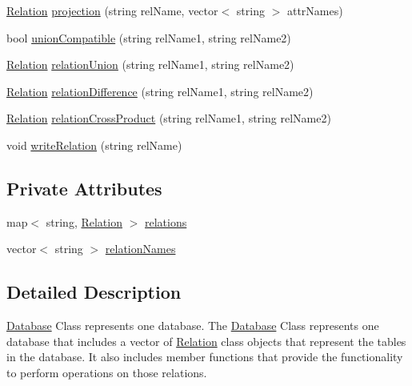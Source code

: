 \begin{DoxyCompactItemize}
\hyperlink{class_relation}{Relation} \hyperlink{class_database_af113b1e566197ff5231c7b792a6a4d98}{projection} (string rel\-Name, vector$<$ string $>$ attr\-Names)
\item 
bool \hyperlink{class_database_a9e61f5f7d4ac2b56ff768c908acec026}{union\-Compatible} (string rel\-Name1, string rel\-Name2)
\item 
\hyperlink{class_relation}{Relation} \hyperlink{class_database_a1fa5ff90a41f1231c58b841a9d3e0475}{relation\-Union} (string rel\-Name1, string rel\-Name2)
\item 
\hyperlink{class_relation}{Relation} \hyperlink{class_database_a8799dbd5a15a2e43c74bc4543fe8fa2e}{relation\-Difference} (string rel\-Name1, string rel\-Name2)
\item 
\hyperlink{class_relation}{Relation} \hyperlink{class_database_adabfc3cb1f51932ff08007200b0972a8}{relation\-Cross\-Product} (string rel\-Name1, string rel\-Name2)
\item 
void \hyperlink{class_database_a35f0c7002a68e6de2d8aa11fc42e8d38}{write\-Relation} (string rel\-Name)
\end{DoxyCompactItemize}
\subsection*{Private Attributes}
\begin{DoxyCompactItemize}
\item 
map$<$ string, \hyperlink{class_relation}{Relation} $>$ \hyperlink{class_database_a170fceaed7e90333c306c8003320efc5}{relations}
\item 
vector$<$ string $>$ \hyperlink{class_database_ae33e101d9096adf93aeee9c95b7e41d2}{relation\-Names}
\end{DoxyCompactItemize}


\subsection{Detailed Description}
\hyperlink{class_database}{Database} Class represents one database. The \hyperlink{class_database}{Database} Class represents one database that includes a vector of \hyperlink{class_relation}{Relation} class objects that represent the tables in the database. It also includes member functions that provide the functionality to perform operations on those relations. 

